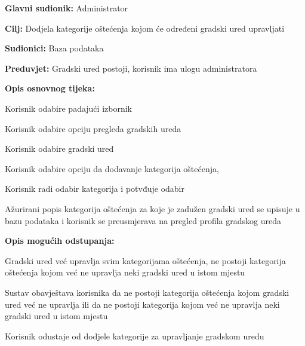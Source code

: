 \noindent {}
\begin{packed_item}

	\item \textbf{Glavni sudionik: }Administrator
	\item  \textbf{Cilj:} Dodjela kategorije oštećenja kojom će određeni gradski ured upravljati
	\item  \textbf{Sudionici:} Baza podataka
	\item  \textbf{Preduvjet:} Gradski ured postoji, korisnik ima ulogu administratora
	\item  \textbf{Opis osnovnog tijeka:}

	\item[] \begin{packed_enum}

		\item Korisnik odabire padajući izbornik
		\item Korisnik odabire opciju pregleda gradskih ureda
		\item Korisnik odabire gradski ured
		\item Korisnik odabire opciju da dodavanje kategorija oštećenja, 
		\item Korisnik radi odabir kategorija i potvđuje odabir
		\item Ažurirani popis kategorija oštećenja za koje je zadužen gradski ured se upisuje u bazu podataka i korisnik se preusmjerava na pregled profila gradskog ureda
	\end{packed_enum}

	\item  \textbf{Opis mogućih odstupanja:}

	\item[] \begin{packed_item}

		\item[4.a] Gradski ured već upravlja svim kategorijama oštećenja, ne postoji kategorija oštećenja kojom već ne upravlja neki gradski ured u istom mjestu
		\item[] \begin{packed_enum}

			\item Sustav obavještava korisnika da ne postoji kategorija oštećenja kojom gradski ured već ne upravlja ili da ne postoji kategorija kojom već ne upravlja neki gradski ured u istom mjestu
			\item Korisnik odustaje od dodjele kategorije za upravljanje gradskom uredu

		\end{packed_enum}
	\end{packed_item}
\end{packed_item}


